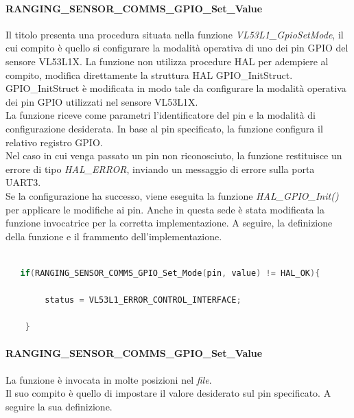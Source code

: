 \documentclass[11pt]{report}
\begin{document}
\paragraph{RANGING\_SENSOR\_COMMS\_GPIO\_Set\_Value}
Il titolo presenta una procedura situata nella funzione \textit{VL53L1\_GpioSetMode}, il cui compito è quello si configurare la modalità operativa di uno dei pin GPIO del sensore VL53L1X.
La funzione non utilizza procedure HAL per adempiere al compito, modifica direttamente la struttura HAL GPIO\_InitStruct.
GPIO\_InitStruct è modificata in modo tale da configurare la modalità operativa dei pin GPIO utilizzati nel sensore VL53L1X.\\
La funzione riceve come parametri l'identificatore del pin e la modalità di configurazione desiderata. In base al pin specificato, la funzione configura il relativo
registro GPIO.\\
Nel caso in cui venga passato un pin non riconosciuto, la funzione restituisce un errore di tipo \textit{HAL\_ERROR}, inviando un messaggio di errore sulla porta UART3.\\
Se la configurazione ha successo, viene eseguita la funzione \textit{HAL\_GPIO\_Init()} per applicare le modifiche ai pin.
Anche in questa sede è stata modificata la funzione invocatrice per la corretta implementazione.
A seguire, la definizione della funzione e il frammento dell'implementazione.

\begin{lstlisting}[language=Cpp, caption={Dettaglio sull'implementazione di \textit{RANGING\_SENSOR\_COMMS\_GPIO\_Set\_Value} in \textit{VL53L1\_GpioSetMode}}]
    
   if(RANGING_SENSOR_COMMS_GPIO_Set_Mode(pin, value) != HAL_OK){
        
        status = VL53L1_ERROR_CONTROL_INTERFACE;

    }

\end{lstlisting}

\paragraph{RANGING\_SENSOR\_COMMS\_GPIO\_Set\_Value}
La funzione è invocata in molte posizioni nel \textit{file}.\\
Il suo compito è quello di impostare il valore desiderato sul pin specificato.
A seguire la sua definizione.

\end{document}
